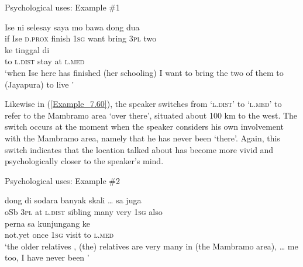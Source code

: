 {\begin{styleExampleTitle}
Psychological uses: Example \#1
\end{styleExampleTitle}

\ea
\label{Example_7.59}
 {Ise} {{ni}} {{selesay}} {saya} {mo} {bawa} {dong} {dua}\\ %
 {if}  Ise  {\textsc{d.prox}}  {finish}  \textsc{1sg}  want  bring  \textsc{3pl}  two\\
\gll ke  {}  {tinggal}  di  {}\\
 to  {\textsc{l.dist}}  {stay}  at  {\textsc{l.med}}\\
\glt 
‘when Ise here has finished (her schooling) I want to bring the two of them to (Jayapura)  to live ’ \textstyleExampleSource{[081025-003-Cv.0135]}
\z



Likewise in (\ref{Example_7.60}), the speaker switches from  ‘\textsc{l.dist}’ to  ‘\textsc{l.med}’ to refer to the Mambramo area  ‘over there’, situated about 100 km to the west. The switch occurs at the moment when the speaker considers his own involvement with the Mambramo area, namely that he has never been  ‘there’. Again, this switch indicates that the location talked about has become more vivid and psychologically closer to the speaker’s mind.


\begin{styleExampleTitle}
Psychological uses: Example \#2
\end{styleExampleTitle}

\ea
\label{Example_7.60}
 {{dong}} {{di}} {{}} {sodara} {{banyak}} {skali} {\ldots} {sa} {juga}\\ %
 oSb  {\textsc{3pl}}  {at}  {\textsc{l.dist}}  sibling  {many}  very { }   \textsc{1sg}  also\\
  {perna}  {sa}  {kunjungang}  ke  {}\\
 {not.yet}  {once}  {\textsc{1sg}}  {visit}  to  {\textsc{l.med}}\\
\glt
‘the older relatives , (the) relatives are very many in (the Mambramo area), {\ldots} me too, I have never been ’ \textstyleExampleSource{[080922-010a-CvNF.0158]}
\z



}
